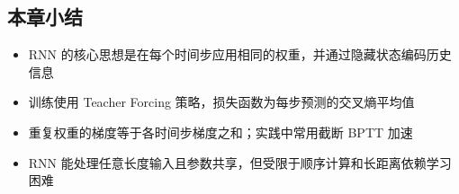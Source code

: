 \subsection{本章小结}

\begin{itemize}
    \item RNN 的核心思想是在每个时间步应用相同的权重，并通过隐藏状态编码历史信息
    \item 训练使用 Teacher Forcing 策略，损失函数为每步预测的交叉熵平均值
    \item 重复权重的梯度等于各时间步梯度之和；实践中常用截断 BPTT 加速
    \item RNN 能处理任意长度输入且参数共享，但受限于顺序计算和长距离依赖学习困难
\end{itemize}



